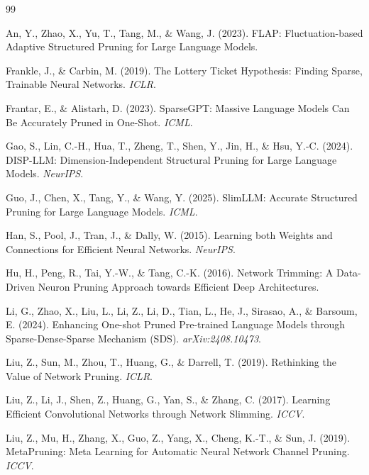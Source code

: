 \documentclass[11pt]{article}
\begin{document}
\begin{thebibliography}{99}

 An, Y., Zhao, X., Yu, T., Tang, M., \& Wang, J. (2023). FLAP: Fluctuation-based Adaptive Structured Pruning for Large Language Models.

 Frankle, J., \& Carbin, M. (2019). The Lottery Ticket Hypothesis: Finding Sparse, Trainable Neural Networks. \textit{ICLR}.

 Frantar, E., \& Alistarh, D. (2023). SparseGPT: Massive Language Models Can Be Accurately Pruned in One-Shot. \textit{ICML}.

 Gao, S., Lin, C.-H., Hua, T., Zheng, T., Shen, Y., Jin, H., \& Hsu, Y.-C. (2024). DISP-LLM: Dimension-Independent Structural Pruning for Large Language Models. \textit{NeurIPS}.

 Guo, J., Chen, X., Tang, Y., \& Wang, Y. (2025). SlimLLM: Accurate Structured Pruning for Large Language Models. \textit{ICML}.

 Han, S., Pool, J., Tran, J., \& Dally, W. (2015). Learning both Weights and Connections for Efficient Neural Networks. \textit{NeurIPS}.

 Hu, H., Peng, R., Tai, Y.-W., \& Tang, C.-K. (2016). Network Trimming: A Data-Driven Neuron Pruning Approach towards Efficient Deep Architectures.

 Li, G., Zhao, X., Liu, L., Li, Z., Li, D., Tian, L., He, J., Sirasao, A., \& Barsoum, E. (2024). Enhancing One-shot Pruned Pre-trained Language Models through Sparse-Dense-Sparse Mechanism (SDS). \textit{arXiv:2408.10473}.

 Liu, Z., Sun, M., Zhou, T., Huang, G., \& Darrell, T. (2019). Rethinking the Value of Network Pruning. \textit{ICLR}.

 Liu, Z., Li, J., Shen, Z., Huang, G., Yan, S., \& Zhang, C. (2017). Learning Efficient Convolutional Networks through Network Slimming. \textit{ICCV}.

 Liu, Z., Mu, H., Zhang, X., Guo, Z., Yang, X., Cheng, K.-T., \& Sun, J. (2019). MetaPruning: Meta Learning for Automatic Neural Network Channel Pruning. \textit{ICCV}.


\end{thebibliography}
\end{document}
